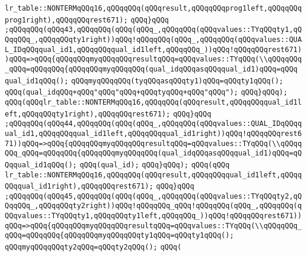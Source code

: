 \verb|lr_table::NONTERMqQQq16,qQQqqQQq(qQQqresult,qQQqqQQqprog1left,qQQqqQQqprog1right),qQQqqQQqrest671);|\newline
\verb|qQQq}qQQq|\newline
\verb|;qQQqqQQq(qQQq43,qQQqqQQq(qQQq(qQQq_,qQQqqQQq(qQQqvalues::TYqQQqty1,qQQqqQQq_,qQQqqQQqty1right))qQQq!qQQqqQQq(qQQq_,qQQqqQQq(qQQqvalues::QUAL_IDqQQqqual_id1,qQQqqQQqqual_id1left,qQQqqQQq_))qQQq!qQQqqQQqrest671))qQQq=>qQQq{qQQqqQQqmyqQQqqQQqresultqQQq=qQQqvalues::TYqQQq(\\qQQqqQQq_qQQq=qQQqqQQq{qQQqqQQqmyqQQqqQQq(qual_idqQQqasqQQqqual_id1)qQQq=qQQq|\newline
\verb|qual_id1qQQq();|\newline
\verb|qQQqmyqQQqqQQq(tyqQQqasqQQqty1)qQQq=qQQqty1qQQq();|\newline
\verb|qQQq(qual_idqQQq+qQQq"qQQq"qQQq+qQQqtyqQQq+qQQq"qQQq");|\newline
\verb|qQQq}qQQq);|\newline
\verb|qQQq(qQQqlr_table::NONTERMqQQq16,qQQqqQQq(qQQqresult,qQQqqQQqqual_id1left,qQQqqQQqty1right),qQQqqQQqrest671);|\newline
\verb|qQQq}qQQq|\newline
\verb|;qQQqqQQq(qQQq44,qQQqqQQq(qQQq(qQQq_,qQQqqQQq(qQQqvalues::QUAL_IDqQQqqual_id1,qQQqqQQqqual_id1left,qQQqqQQqqual_id1right))qQQq!qQQqqQQqrest671))qQQq=>qQQq{qQQqqQQqmyqQQqqQQqresultqQQq=qQQqvalues::TYqQQq(\\qQQqqQQq_qQQq=qQQqqQQq{qQQqqQQqmyqQQqqQQq(qual_idqQQqasqQQqqual_id1)qQQq=qQQqqual_id1qQQq();|\newline
\verb|qQQq(qual_id);|\newline
\verb|qQQq}qQQq);|\newline
\verb|qQQq(qQQq|\newline
\verb|lr_table::NONTERMqQQq16,qQQqqQQq(qQQqresult,qQQqqQQqqual_id1left,qQQqqQQqqual_id1right),qQQqqQQqrest671);|\newline
\verb|qQQq}qQQq|\newline
\verb|;qQQqqQQq(qQQq45,qQQqqQQq(qQQq(qQQq_,qQQqqQQq(qQQqvalues::TYqQQqty2,qQQqqQQq_,qQQqqQQqty2right))qQQq!qQQqqQQq_qQQq!qQQqqQQq(qQQq_,qQQqqQQq(qQQqvalues::TYqQQqty1,qQQqqQQqty1left,qQQqqQQq_))qQQq!qQQqqQQqrest671))qQQq=>qQQq{qQQqqQQqmyqQQqqQQqresultqQQq=qQQqvalues::TYqQQq(\\qQQqqQQq_qQQq=qQQqqQQq{qQQqqQQqmyqQQqqQQqty1qQQq=qQQqty1qQQq();|\newline
\verb|qQQqmyqQQqqQQqty2qQQq=qQQqty2qQQq();|\newline
\verb|qQQq(|\newline
